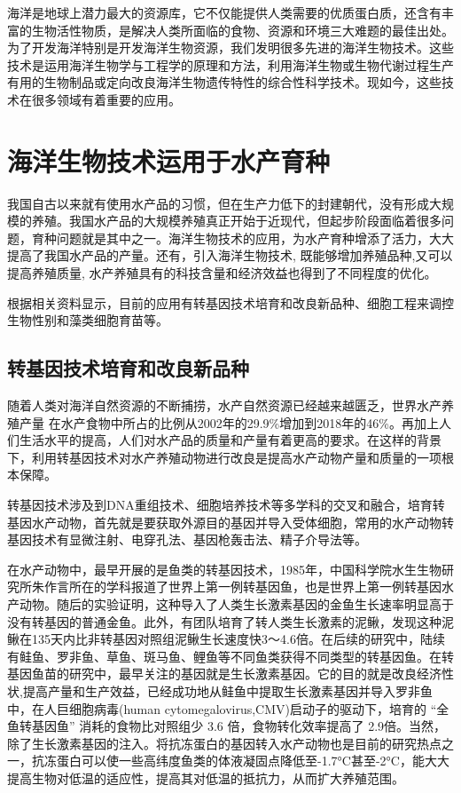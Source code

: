 \documentclass[a4paper,twocolumn]{ctexart}
\begin{document}
海洋是地球上潜力最大的资源库，它不仅能提供人类需要的优质蛋白质，还含有丰富的生物活性物质，是解决人类所面临的食物、资源和环境三大难题的最佳出处。为了开发海洋特别是开发海洋生物资源，我们发明很多先进的海洋生物技术。这些技术是运用海洋生物学与工程学的原理和方法，利用海洋生物或生物代谢过程生产有用的生物制品或定向改良海洋生物遗传特性的综合性科学技术。现如今，这些技术在很多领域有着重要的应用。

\section{海洋生物技术运用于水产育种}
我国自古以来就有使用水产品的习惯，但在生产力低下的封建朝代，没有形成大规模的养殖。我国水产品的大规模养殖真正开始于近现代，但起步阶段面临着很多问题，育种问题就是其中之一。海洋生物技术的应用，为水产育种增添了活力，大大提高了我国水产品的产量。还有，引入海洋生物技术, 既能够增加养殖品种,又可以提高养殖质量, 水产养殖具有的科技含量和经济效益也得到了不同程度的优化\cite{祝晓栋2019探究海洋生物技术在水产养殖中应用的可行性}。

根据相关资料显示，目前的应用有转基因技术培育和改良新品种、细胞工程来调控生物性别和藻类细胞育苗等。

\subsection{转基因技术培育和改良新品种}
随着人类对海洋自然资源的不断捕捞，水产自然资源已经越来越匮乏，世界水产养殖产量
在水产食物中所占的比例从2002年的29.9\%增加到2018年的46\%。再加上人们生活水平的提高，人们对水产品的质量和产量有着更高的要求。在这样的背景下，利用转基因技术对水产养殖动物进行改良是提高水产动物产量和质量的一项根本保障。

转基因技术涉及到DNA重组技术、细胞培养技术等多学科的交叉和融合，培育转基因水产动物，首先就是要获取外源目的基因并导入受体细胞，常用的水产动物转基因技术有显微注射、电穿孔法、基因枪轰击法、精子介导法等\cite{黄海燕2009转基因技术在水产动物中的运用}。

在水产动物中，最早开展的是鱼类的转基因技术，1985年，中国科学院水生生物研究所朱作言所在的学科报道了世界上第一例转基因鱼，也是世界上第一例转基因水产动物\cite{1985Novel}。随后的实验证明，这种导入了人类生长激素基因的金鱼生长速率明显高于没有转基因的普通金鱼。此外，有团队培育了转人类生长激素的泥鳅，发现这种泥鳅在135天内比非转基因对照组泥鳅生长速度快3～4.6倍\cite{朱作言1986BIOLOGICAL}。在后续的研究中，陆续有鲑鱼、罗非鱼、草鱼、斑马鱼、鲤鱼等不同鱼类获得不同类型的转基因鱼。在转基因鱼苗的研究中，最早关注的基因就是生长激素基因。它的目的就是改良经济性状,提高产量和生产效益，已经成功地从鲑鱼中提取生长激素基因并导入罗非鱼中，在人巨细胞病毒(human cytomegalovirus,CMV)启动子的驱动下，培育的 “全鱼转基因鱼” 消耗的食物比对照组少 3.6 倍，食物转化效率提高了 2.9倍\cite{2000Growth}。当然，除了生长激素基因的注入。将抗冻蛋白的基因转入水产动物也是目前的研究热点之一，抗冻蛋白可以使一些高纬度鱼类的体液凝固点降低至-1.7°C甚至-2°C，能大大提高生物对低温的适应性，提高其对低温的抵抗力，从而扩大养殖范围。
\end{document}
